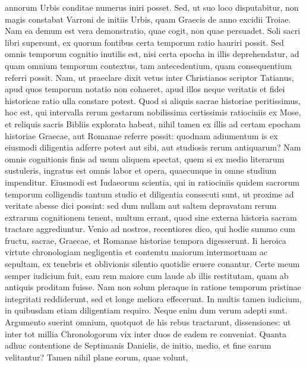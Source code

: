 annorum Urbis conditae numerus iniri posset.
%
Sed, ut suo loco disputabitur,
non magis constabat Varroni de initiis Urbis, quam Graecis de
anno excidii Troiae.
Nam ea demum est vera demonstratio, quae cogit,
non quae persuadet.
Soli sacri libri supersunt, ex quorum fontibus
certa temporum ratio hauriri possit.
Sed omnis temporum cognitio
inutilis est, nisi certa epocha in illis deprehendatur, ad quam omnium
temporum contextus, tam antecedentium, quam consequentium referri
possit.
Nam, ut praeclare dixit vetus inter Christianos scriptor
Tatianus, apud quos temporum notatio non cohaeret, apud illos neque
veritatis et fidei historicae ratio ulla constare potest.
Quod si aliquis
sacrae historiae peritissimus, hoc est, qui intervalla rerum gestarum
nobilissima certissimis ratiociniis ex Mose, et
 reliquis sacris Bibliis explorata
habeat, nihil tamen ex illis ad certam epocham historiae Graecae,
aut Romanae referre possit: quodnam adiumentum is ex eiusmodi
diligentia adferre potest aut sibi, aut studiosis rerum antiquarum?
Nam omnis cognitionis finis ad usum aliquem spectat, quem si ex medio
literarum sustuleris, ingratus est omnis labor et opera, quaecunque
in omne studium impenditur.
Eiusmodi est Iudaeorum scientia, qui
in ratiociniis quidem sacrorum temporum colligendis tantum studio
et diligentia consecuti sunt, ut proxime ad veritate abesse dici possint: sed
dum nullam aut saltem depravatam rerum extrarum cognitionem
tenent, multum errant, quod sine externa historia sacram tractare
aggrediuntur.
Venio ad nostros, recentiores dico, qui hodie summo
cum fructu, sacrae, Graecae, et Romanae historiae tempora digesserunt.
Ii heroica virtute chronologiam negligentia et contemtu maiorum
intermortuam ac sepultam, ex tenebris et oblivionis silentio quotidie
eruere conantur.
Certe meum semper iudicium fuit, eam rem maiore
cum laude ab illis restitutam, quam ab antiquis proditam fuisse.
Nam
non solum pleraque in ratione temporum pristinae integritati reddiderunt,
sed et longe meliora effecerunt.
In multis tamen iudicium, in quibusdam
etiam diligentiam requiro.
Neque enim dum verum adepti sunt.
Argumento suerint omnium, quotquot de his rebus tractarunt,
 dissensiones:
ut inter tot millia Chronologorum vix inter duos de eadem re
conveniat.
Quanta adhuc contentione de Septimanis Danielis, de initio,
medio, et fine earum velitantur?
Tamen nihil plane eorum, quae volunt,
